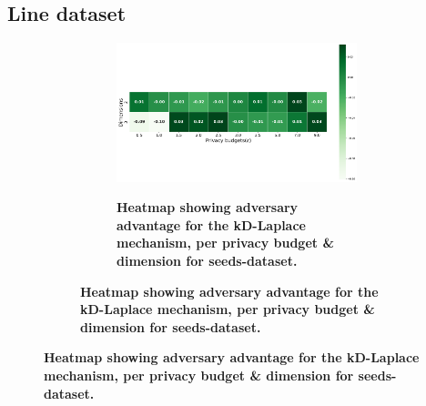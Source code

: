 {\subsection{Line dataset}
\begin{figure}[H]
  \centering
  \begin{subfigure}[b]{0.80\textwidth}
    \begin{subfigure}[c]{1\textwidth}
      \caption{\textbf{Heatmap showing adversary advantage for the kD-Laplace mechanism, per privacy budget \& dimension for seeds-dataset.}}
      \includegraphics[width=1\textwidth]{Results/nd-laplace/nd-Laplace/line-dataset/attack_adv.png}
      \label{fig:privacy_line-dataset_adversial_advantage_kd-laplace}
    \end{subfigure}
    \vfill %


\end{subfigure}
\end{figure}}
